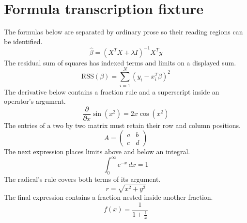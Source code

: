 \documentclass[11pt]{article}
\begin{document}
\section*{Formula transcription fixture}
The formulas below are separated by ordinary prose so their reading regions can be identified.
\begin{equation}
\hat\beta=(X^TX+\lambda I)^{-1}X^Ty
\end{equation}
The residual sum of squares has indexed terms and limits on a displayed sum.
\begin{equation}
\mathrm{RSS}(\beta)=\sum_{i=1}^{N}(y_i-x_i^T\beta)^2
\end{equation}
The derivative below contains a fraction rule and a superscript inside an operator's argument.
\begin{equation}
\frac{\partial}{\partial x}\sin(x^2)=2x\cos(x^2)
\end{equation}
The entries of a two by two matrix must retain their row and column positions.
\begin{equation}
A=\begin{pmatrix}a&b\\c&d\end{pmatrix}
\end{equation}
The next expression places limits above and below an integral.
\begin{equation}
\int_0^\infty e^{-x}\,dx=1
\end{equation}
The radical's rule covers both terms of its argument.
\begin{equation}
r=\sqrt{x^2+y^2}
\end{equation}
The final expression contains a fraction nested inside another fraction.
\begin{equation}
f(x)=\frac{1}{1+\frac{1}{x}}
\end{equation}
\end{document}
